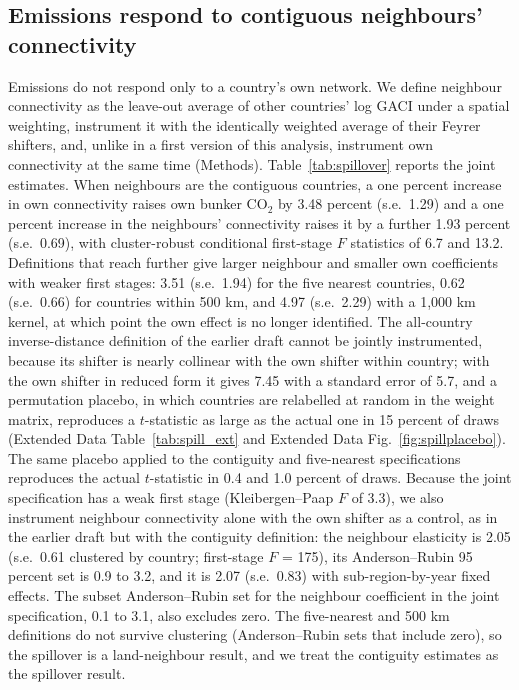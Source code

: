 \documentclass[12pt]{article}
\begin{document}
\subsection*{Emissions respond to contiguous neighbours' connectivity}
Emissions do not respond only to a country's own network. We define
neighbour connectivity as the leave-out average of other countries' log
GACI under a spatial weighting, instrument it with the identically weighted
average of their Feyrer shifters, and, unlike in a first version of this
analysis, instrument own connectivity at the same time (Methods).
Table~\ref{tab:spillover} reports the joint estimates. When neighbours are
the contiguous countries, a one percent increase in own connectivity raises
own bunker CO$_2$ by 3.48 percent (s.e.\ 1.29) and a one percent increase
in the neighbours' connectivity raises it by a further 1.93 percent (s.e.\
0.69), with cluster-robust conditional first-stage $F$ statistics of 6.7
and 13.2. Definitions that reach further give larger neighbour and
smaller own coefficients with weaker first stages: 3.51 (s.e.\ 1.94) for
the five nearest countries, 0.62 (s.e.\ 0.66) for countries within 500 km,
and 4.97 (s.e.\ 2.29) with a 1{,}000 km kernel, at which point the own
effect is no longer identified. The all-country inverse-distance
definition of the earlier draft cannot be jointly instrumented, because its
shifter is nearly collinear with the own shifter within country; with the
own shifter in reduced form it gives 7.45 with a standard error of 5.7,
and a permutation placebo, in which countries are relabelled at random in
the weight matrix, reproduces a $t$-statistic as large as the actual one in
15 percent of draws (Extended
Data Table~\ref{tab:spill_ext} and Extended Data
Fig.~\ref{fig:spillplacebo}). The same placebo applied to the contiguity
and five-nearest specifications reproduces the actual $t$-statistic in 0.4
and 1.0 percent of draws. Because the joint specification has a weak
first stage (Kleibergen--Paap $F$ of 3.3), we also instrument neighbour
connectivity alone with the own shifter as a control,
as in the earlier draft but with the contiguity definition: the neighbour
elasticity is 2.05 (s.e.\ 0.61 clustered by country; first-stage $F$ =
175), its Anderson--Rubin 95 percent set is 0.9 to 3.2, and it is 2.07
(s.e.\ 0.83) with sub-region-by-year fixed effects. The subset
Anderson--Rubin set for the neighbour coefficient in the joint
specification, 0.1 to 3.1, also excludes zero. The five-nearest and 500 km
definitions do not survive clustering (Anderson--Rubin sets that include
zero), so the spillover is a land-neighbour result, and we treat the
contiguity estimates as the spillover result.
\end{document}
